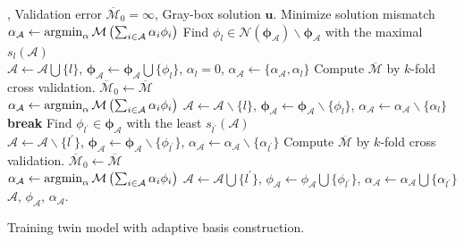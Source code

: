 \begin{algorithm}[H]
\begin{algorithmic}[1]
,
        Validation error $\overline{\mathcal{M}}_0 = \infty$,
        Gray-box solution $\boldsymbol{u}$.
\STATE Minimize solution mismatch 
       $
           \alpha_{\mathcal{A}} \leftarrow \operatorname*{\arg\!\min}_{\alpha} \mathcal{M}\left(\sum_{i \in \mathcal{A}} \alpha_i \phi_i\right)
       $ 
\LOOP 
\STATE Find $\phi_{l}\in \mathcal{N}(\boldsymbol{\phi}_{\mathcal{A}}) \backslash 
       \boldsymbol{\phi}_{\mathcal{A}}$ with the maximal $s_l(\mathcal{A})$ \\
       $\mathcal{A} \leftarrow 
       \mathcal{A} \bigcup \{l\}$, $\boldsymbol{\phi}_{\mathcal{A}} \leftarrow 
       \boldsymbol{\phi}_{\mathcal{A}}
       \bigcup \{\phi_{l}\}$, $\alpha_l = 0$,
       $\alpha_{\mathcal{A}} \leftarrow \{\alpha_{\mathcal{A}}, \alpha_l\}$
\STATE Compute $\overline{\mathcal{M}}$ by $k$-fold cross validation.
    \STATE $\overline{\mathcal{M}}_0\leftarrow \overline{\mathcal{M}}$\\
       $
           \alpha_{\mathcal{A}} \leftarrow \operatorname*{\arg\!\min}_{\alpha} \mathcal{M}\left(\sum_{i \in \mathcal{A}} \alpha_i \phi_i\right)
       $
\ELSE \STATE 
       $\mathcal{A} \leftarrow 
       \mathcal{A} \backslash \{l\}$, $\boldsymbol{\phi}_{\mathcal{A}} \leftarrow 
       \boldsymbol{\phi}_{\mathcal{A}}
       \backslash \{\phi_{l}\}$, $\alpha_{\mathcal{A}} \leftarrow \alpha_{\mathcal{A}} \backslash 
       \{\alpha_l\}$
      \textbf{break}
\ENDIF
\STATE Find $\phi_{l^\prime}\in 
       \boldsymbol{\phi}_{\mathcal{A}}$ with the least $s_{l^\prime}(\mathcal{A})$  \\
\STATE  
       $\mathcal{A} \leftarrow 
       \mathcal{A} \backslash \{l^\prime\}$,
       $\boldsymbol{\phi}_{\mathcal{A}} \leftarrow \boldsymbol{\phi}_{\mathcal{A}}
        \backslash\{\phi_{l^\prime}\}$, 
       $\alpha_{\mathcal{A}} \leftarrow \alpha_{\mathcal{A}}\backslash \{\alpha_{l^\prime}\}$
\STATE Compute $\overline{\mathcal{M}}$ by $k$-fold cross validation.
\STATE $\overline{\mathcal{M}}_0 \leftarrow \overline{\mathcal{M}}$\\
       $
           \alpha_{\mathcal{A}} \leftarrow \operatorname*{\arg\!\min}_{\alpha} \mathcal{M}\left(\sum_{i \in \mathcal{A}} \alpha_i \phi_i\right)
       $
\ELSE \STATE
       $\mathcal{A} \leftarrow \mathcal{A}\bigcup \{l^\prime\}$,
       $\phi_{\mathcal{A}}\leftarrow \phi_{\mathcal{A}} 
       \bigcup \{\phi_{l^\prime}\}$, $\alpha_{\mathcal{A}} \leftarrow 
       \alpha_{\mathcal{A}}\bigcup \{\alpha_{l^\prime}\}$
\ENDIF
\ENDIF
\ENDLOOP
\ENSURE $\mathcal{A}$, $\phi_{\mathcal{A}}$, $\alpha_{\mathcal{A}}$.
\end{algorithmic}
\caption{Training twin model with adaptive basis construction.}
\label{alg: train twin}
\end{algorithm}


